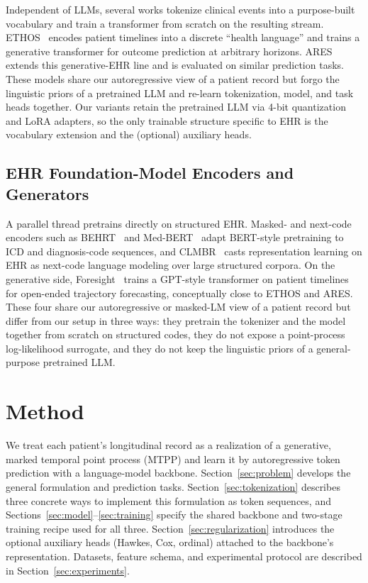 \documentclass{article}
\begin{document}
Independent of LLMs, several works tokenize clinical events into a purpose-built vocabulary and train a transformer from scratch on the resulting stream.
ETHOS~\citep{renc2024zero} encodes patient timelines into a discrete ``health language'' and trains a generative transformer for outcome prediction at arbitrary horizons. ARES~\citep{renc2025foundation} extends this generative-EHR line and is evaluated on similar prediction tasks.
These models share our autoregressive view of a patient record but forgo the linguistic priors of a pretrained LLM and re-learn tokenization, model, and task heads together.
Our variants retain the pretrained LLM via 4-bit quantization and LoRA adapters, so the only trainable structure specific to EHR is the vocabulary extension and the (optional) auxiliary heads.

\subsection{EHR Foundation-Model Encoders and Generators}

A parallel thread pretrains directly on structured EHR.
Masked- and next-code encoders such as BEHRT~\citep{li2020behrt} and Med-BERT~\citep{rasmy2021med} adapt BERT-style pretraining to ICD and diagnosis-code sequences, and CLMBR~\citep{steinberg2021language} casts representation learning on EHR as next-code language modeling over large structured corpora.
On the generative side, Foresight~\citep{kraljevic2024foresight} trains a GPT-style transformer on patient timelines for open-ended trajectory forecasting, conceptually close to ETHOS and ARES.
These four share our autoregressive or masked-LM view of a patient record but differ from our setup in three ways: they pretrain the tokenizer and the model together from scratch on structured codes, they do not expose a point-process log-likelihood surrogate, and they do not keep the linguistic priors of a general-purpose pretrained LLM.

\section{Method}
\label{sec:method}

We treat each patient's longitudinal record as a realization of a generative, marked temporal point process (MTPP) and learn it by autoregressive token prediction with a language-model backbone.
Section~\ref{sec:problem} develops the general formulation and prediction tasks.
Section~\ref{sec:tokenization} describes three concrete ways to implement this formulation as token sequences, and Sections~\ref{sec:model}--\ref{sec:training} specify the shared backbone and two-stage training recipe used for all three.
Section~\ref{sec:regularization} introduces the optional auxiliary heads (Hawkes, Cox, ordinal) attached to the backbone's representation.
Datasets, feature schema, and experimental protocol are described in Section~\ref{sec:experiments}.
\end{document}
